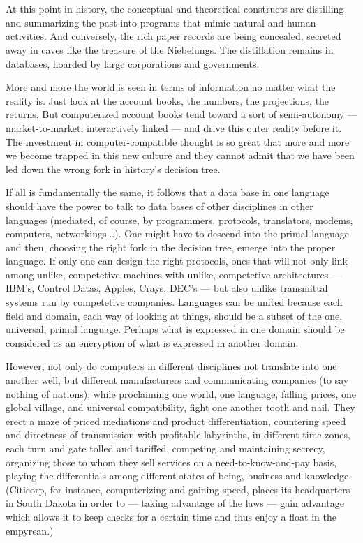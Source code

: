 \chapter{}

At this point in history, the conceptual and theoretical constructs are distilling and summarizing the past into programs that mimic natural and human activities. And conversely, the rich paper records are being concealed, secreted away in caves like the treasure of the Niebelungs. The distillation remains in databases, hoarded by large corporations and governments.

More and more the world is seen in terms of information no matter what the reality is. Just look at the account books, the numbers, the projections, the returns. But computerized account books tend toward a sort of semi-autonomy --- market-to-market, interactively linked --- and drive this outer reality before it. The investment in computer-compatible thought is so great that more and more we become trapped in this new culture and they cannot admit that we have been led down the wrong fork in history's decision tree.

If all is fundamentally the same, it follows that a data base in one language should have the power to talk to data bases of other disciplines in other languages (mediated, of course, by programmers, protocols, translators, modems, computers, networkings...). One might have to descend into the primal language and then, choosing the right fork in the decision tree, emerge into the proper language. If only one can design the right protocols, ones that will not only link among unlike, competetive machines with unlike, competetive architectures --- IBM's, Control Datas, Apples, Crays, DEC's --- but also unlike transmittal systems run by competetive companies. Languages can be united because each field and domain, each way of looking at things, should be a subset of the one, universal, primal language. Perhaps what is expressed in one domain should be considered as an encryption of what is expressed in another domain.

However, not only do computers in different disciplines not translate into one another well, but different manufacturers and communicating companies (to say nothing of nations), while proclaiming one world, one language, falling prices, one global village, and universal compatibility, fight one another tooth and nail. They erect a maze of priced mediations and product differentiation, countering speed and directness of transmission with profitable labyrinths, in different time-zones, each turn and gate tolled and tariffed, competing and maintaining secrecy, organizing those to whom they sell services on a need-to-know-and-pay basis, playing the differentials among different states of being, business and knowledge. (Citicorp, for instance, computerizing and gaining speed, places its headquarters in South Dakota in order to --- taking advantage of the laws --- gain advantage which allows it to keep checks for a certain time and thus enjoy a float in the empyrean.)

